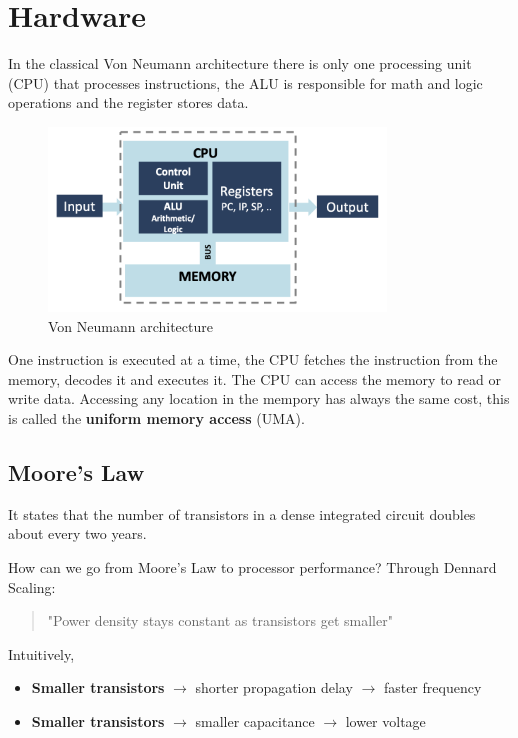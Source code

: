 
\chapter{Hardware}

In the classical Von Neumann architecture there is only one processing unit (CPU) that processes instructions, the ALU is responsible for math and logic operations and the register stores data.

\begin{figure}[H]
    \centering
    \includegraphics[width=0.8\textwidth]{assets/fig2.png}
    \caption{Von Neumann architecture}
    \label{fig:von_neumann_architecture}
\end{figure}

One instruction is executed at a time, the CPU fetches the instruction from the memory, decodes it and executes it. The CPU can access the memory to read or write data. Accessing any location in the mempory has always the same cost, this is called the \textbf{uniform memory access} (UMA).

\section{Moore's Law}

\begin{definitionblock}
    It states that the number of transistors in a dense integrated circuit doubles about every two years.
\end{definitionblock}

How can we go from Moore's Law to processor performance? Through Dennard Scaling:
\begin{quotation}
    "Power density stays constant as transistors get smaller"
\end{quotation}

Intuitively, 
\begin{itemize}
    \item \textbf{Smaller transistors} $\to$ shorter propagation delay $\to$ faster frequency
    \item \textbf{Smaller transistors} $\to$ smaller capacitance $\to$ lower voltage
\end{itemize}

